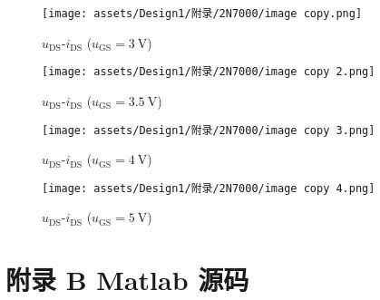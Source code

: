 \documentclass[UTF8]{article}
\theoremstyle{MyLineTheoremStyle} %
\theoremstyle{MyBlockTheoremStyle} %
\theoremstyle{MySubsubsectionStyle} %
\begin{document}
\begin{figure}[H]\centering
    \texttt{[image: assets/Design1/附录/2N7000/image copy.png]}
    \caption{$u_{\text{DS}}$-$i_{\text{DS}}$ ($u_{\text{GS}} = 3 \ \mathrm{V}$)}
\end{figure}
\begin{figure}[H]\centering
    \texttt{[image: assets/Design1/附录/2N7000/image copy 2.png]}
    \caption{$u_{\text{DS}}$-$i_{\text{DS}}$ ($u_{\text{GS}} = 3.5 \ \mathrm{V}$)}
\end{figure}
\begin{figure}[H]\centering
    \texttt{[image: assets/Design1/附录/2N7000/image copy 3.png]}
    \caption{$u_{\text{DS}}$-$i_{\text{DS}}$ ($u_{\text{GS}} = 4 \ \mathrm{V}$)}
\end{figure}
\begin{figure}[H]\centering
    \texttt{[image: assets/Design1/附录/2N7000/image copy 4.png]}
    \caption{$u_{\text{DS}}$-$i_{\text{DS}}$ ($u_{\text{GS}} = 5 \ \mathrm{V}$)}
\end{figure}


\section*{附录 B\hspace*{20pt} Matlab 源码}
\thispagestyle{fancy} 

\end{document}
